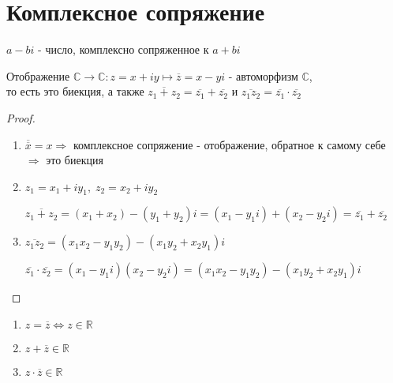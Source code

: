 \section{Комплексное сопряжение}
$a - bi$ - число, комплексно сопряженное к $a + bi$
\begin{theorem-non}
    Отображение $\mathbb{C} \to \mathbb{C} : z = x + iy \mapsto \overline{z} = x - yi$ - автоморфизм $\mathbb{C}$, \\
    то есть это биекция, а также $\overline{z_1 + z_2} = \overline{z_1} + \overline{z_2}$ и $\overline{z_1z_2} = \overline{z_1} \cdot \overline{z_2}$
\end{theorem-non}
\begin{proof}
    \begin{enumerate}
    \item $\overline{\overline{x}} = x \Rightarrow$ комплексное сопряжение - отображение, обратное к самому себе $\Rightarrow$ это биекция
    \item  $z_1 = x_1 + iy_1,\; z_2 = x_2 + iy_2$ 
    
    $\overline{z_1 + z_2} = (x_1 + x_2) - (y_1 + y_2)i = (x_1 - y_1i) + (x_2 - y_2i) = \overline{z_1} + \overline{z_2}$
    \item $\overline{z_1z_2} = (x_1x_2 - y_1y_2) - (x_1y_2 + x_2y_1)i$
    
    $\overline{z_1} \cdot \overline{z_2} = (x_1 - y_1i)(x_2 - y_2i) = (x_1x_2 - y_1y_2) - (x_1y_2 + x_2y_1)i$
    \end{enumerate}
\end{proof}
\begin{notice}
    \begin{enumerate}
    \item $z = \overline{z} \Leftrightarrow z \in \mathbb{R}$
    \item $z + \overline{z} \in \mathbb{R}$
    \item $z \cdot \overline{z} \in \mathbb{R}$
    \end{enumerate}
\end{notice}